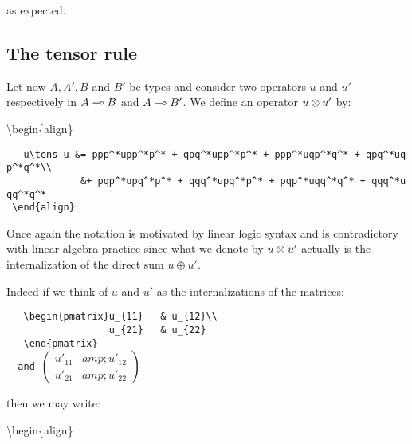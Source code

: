 as expected.

\subsection{The tensor rule}\label{the-tensor-rule}

Let now \(A, A', B\) and \(B'\) be types and consider two operators
\(u\) and \(u'\) respectively in \(A\multimap B\) and \(A\multimap B'\). We
define an operator \(u\otimes u'\) by:

\begin{description}
\tightlist
\item[]
\textbackslash{}begin\{align\}
\end{description}

\texttt{~~~u\textbackslash{}tens~u\textquotesingle{}~\&=~ppp\^{}*upp\^{}*p\^{}*~+~qpq\^{}*upp\^{}*p\^{}*~+~ppp\^{}*uqp\^{}*q\^{}*~+~qpq\^{}*uqp\^{}*q\^{}*\textbackslash{}\textbackslash{}}\\
\texttt{~~~~~~~~~~~~~\&+~pqp\^{}*u\textquotesingle{}pq\^{}*p\^{}*~+~qqq\^{}*u\textquotesingle{}pq\^{}*p\^{}*~+~pqp\^{}*u\textquotesingle{}qq\^{}*q\^{}*~+~qqq\^{}*u\textquotesingle{}qq\^{}*q\^{}*}\\
\texttt{~\textbackslash{}end\{align\}}

Once again the notation is motivated by linear logic syntax and is
contradictory with linear algebra practice since what we denote by
\(u\otimes u'\) actually is the internalization of the direct sum
\(u\oplus u'\).

Indeed if we think of \(u\) and \(u'\) as the internalizations of the
matrices:

\begin{description}
\tightlist
\item[]
\end{description}

\texttt{~~~\textbackslash{}begin\{pmatrix\}u\_\{11\}~~~\&~u\_\{12\}\textbackslash{}\textbackslash{}}\\
\texttt{~~~~~~~~~~~~~~~~~~u\_\{21\}~~~\&~u\_\{22\}}\\
\texttt{~~~\textbackslash{}end\{pmatrix\}}\\
\texttt{~}\texttt{~and~}\(\begin{pmatrix}u'_{11} &amp; u'_{12}\\
                   u'_{21} &amp; u'_{22}
    \end{pmatrix}\)

then we may write:

\begin{description}
\tightlist
\item[]
\textbackslash{}begin\{align\}
\end{description}

